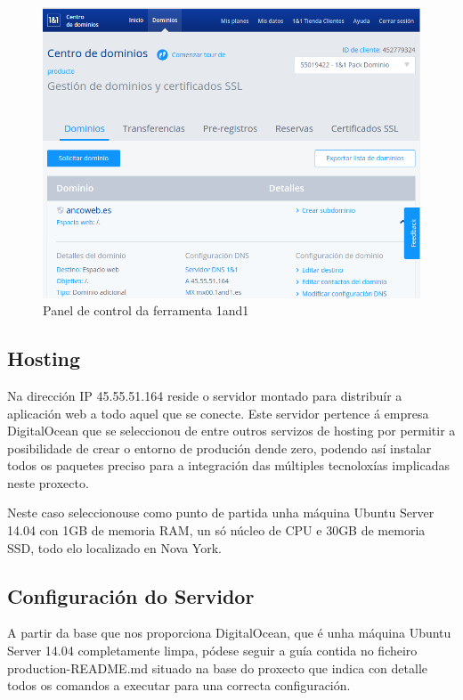         \begin{figure}[htp]
        \begin{center}
            \includegraphics[scale=0.5]{figures/1and1Capture.png}
            \caption{Panel de control da ferramenta 1and1}
        \label{fig:1and1Capture}
        \end{center}
        \end{figure}
    
    \subsection{Hosting}
        Na dirección IP 45.55.51.164 reside o servidor montado para distribuír a aplicación web a 
        todo aquel que se conecte. Este servidor pertence á empresa DigitalOcean
        \cite{digitalocean-website} que se seleccionou de entre outros servizos de hosting por 
        permitir a posibilidade de crear o entorno de produción dende zero, podendo así instalar 
        todos os paquetes preciso para a integración das múltiples tecnoloxías implicadas neste 
        proxecto.
        
        Neste caso seleccionouse como punto de partida unha máquina Ubuntu Server 14.04 con 1GB de 
        memoria RAM, un só núcleo de CPU e 30GB de memoria SSD, todo elo localizado en Nova York.
    
    \subsection{Configuración do Servidor}
        A partir da base que nos proporciona DigitalOcean, que é unha máquina Ubuntu Server 14.04 
        completamente limpa, pódese seguir a guía contida no ficheiro production-README.md situado
        na base do proxecto que indica con detalle todos os comandos a executar para una correcta 
        configuración. 
        
